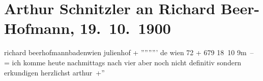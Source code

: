 

         
         \renewcommand{\erwaehntePersonen}{Personen: Richard Beer-Hofmann}
         \renewcommand{\erwaehnteOrte}{Orte: Baden bei Wien, Julienhof, Wien}
         \renewcommand{\erwaehnteWerke}{}
               \section[Arthur Schnitzler an Richard Beer-Hofmann, 19. 10. 1900]{ Arthur Schnitzler an Richard Beer-Hofmann, 19. 10. 1900}\nopagebreak{}\rehead{ }\begin{ledgroupsized}[t]{13cm}\normalsize\beginnumbering{} \toendnotes[C]{\smallbreak\pagebreak[2]} 
\pstart{}{\pb}richard beerhofmann\pend{}\pstart{}badenwien julienhof\pend{}{\bigskip}\pstart
           \noindent{}{\pb}+ ''''''''' de wien 72 + 679 18 10{ }9m – \pend
           \pstart
           = ich komme heute nachmittags nach vier aber noch nicht definitiv sondern erkundigen
               herzlichst \spacefill\mbox{arthur +''}\pend
           
         
         \endnumbering{}\end{ledgroupsized}  \newcommand{\dateiname}{L01079}\newcommand{\titel}{Arthur Schnitzler an Richard Beer-Hofmann, 19. 10. 1900}\newcommand{\editorInnen}{Martin Anton Müller und Gerd-Hermann Susen}
      